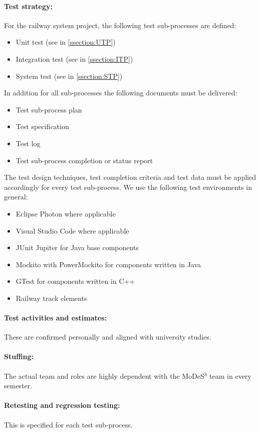 \paragraph{Test strategy:} 
For the railway system project, the following test sub-processes are defined:
\begin{itemize}
	\item Unit test (see in \autoref{ssection:UTP})
	\item Integration test (see in \autoref{ssection:ITP})
	\item System test (see in \autoref{ssection:STP})
\end{itemize}
In addition for all sub-processes the following documents must be delivered:
\begin{itemize}
	\item Test sub-process plan
	\item Test specification
	\item Test log
	\item Test sub-process completion or status report
\end{itemize}
The test design techniques, test completion criteria and test data must be applied accordingly for every test sub-process. We use the following test environments in general:
\begin{itemize}
	\item Eclipse Photon where applicable
	\item Visual Studio Code where applicable
	\item JUnit Jupiter for Java base components
	\item Mockito with PowerMockito for components written in Java
	\item GTest for components written in C++
	\item Railway track elements
\end{itemize}
\paragraph{Test activities and estimates:} These are confirmed personally and aligned with university studies.
\paragraph{Stuffing:} The actual team and roles are highly dependent with the MoDeS$^3$ team in every semester.
\paragraph{Retesting and regression testing:} This is specified for each test sub-process. 

